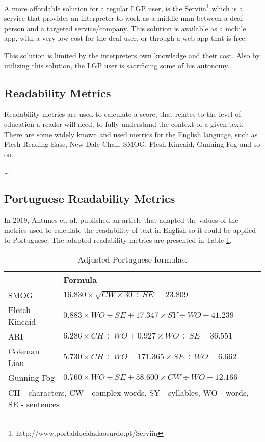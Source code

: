 A more affordable solution for a regular \gls{LGP} user, is the Serviin\footnote{http://www.portaldocidadaosurdo.pt/Serviin} which is a service that provides an interpreter to work as a middle-man between a deaf person and a targeted service/company.
This solution is available as a mobile app, with a very low cost for the deaf user, or through a  web app that is free.

This solution is limited by the interpreters own knowledge and their cost.
Also by utilizing this solution, the \gls{LGP} user is sacrificing some of his autonomy.

\subsection{Readability Metrics}

Readability metrics are used to calculate a score\cite{meyer2003text}, that relates to the level of education a reader will need, to fully understand the context of a given text.
There are some widely known and used metrics for the English language, such as Flesh Reading Ease, New Dale-Chall, SMOG, Flesh-Kincaid, Gunning Fog and so on.

\dots %

\subsection{Portuguese Readability Metrics}

In 2019, Antunes et. al.\cite{antunes2019analyzing} published an article that adapted the values of the metrics used to calculate the readability of text in English so it could be applied to Portuguese.
The adapted readability metrics are presented in Table \ref{table:ptformulas}.

\begin{table}
    \caption{Adjusted Portuguese formulas.}
    \label{table:ptformulas}
    \begin{tabular}{l|l}
        \hline
        {} & {\bfseries Formula} \\
        \hline
        SMOG & \(16.830 \times \sqrt{CW \times 30 \div SE} - 23.809\)  \\
        \hline
        Flesch-Kincaid & \(0.883 \times WO \div SE + 17.347 \times SY \div WO - 41.239\) \\
        \hline
        ARI & \(6.286 \times CH \div WO + 0.927 \times WO \div SE - 36.551\) \\
        \hline
        Coleman Liau & \(5.730 \times CH \div WO - 171.365 \times SE \div WO - 6.662\) \\
        \hline
        Gunning Fog & \(0.760 \times WO \div SE + 58.600 \times CW \div WO - 12.166\) \\
        \hline
        \multicolumn{2}{l}{CH - characters, CW - complex words, SY - syllables, WO - words, SE - sentences}
    \end{tabular}
\end{table}

